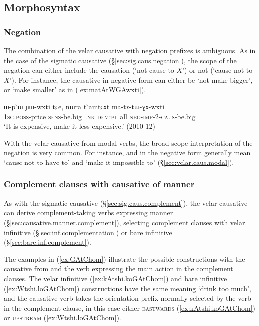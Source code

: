  
\subsection{Morphosyntax} \label{sec:velar.causative.morphosyntax}

\subsubsection{Negation} \label{sec:velar.causative.negation}
The combination of the velar causative with negation prefixes is ambiguous. As in the case of the sigmatic causative (§\ref{sec:sig.caus.negation}), the scope of the negation can either include the causation (`not cause to $X$') or not (`cause not to $X$'). For instance, the causative   in negative form can either be `not make bigger', or  `make smaller' as in (\ref{ex:matAtWGAwxti}).

\begin{exe}
\ex \label{ex:matAtWGAwxti}
\gll  ɯ-pʰɯ ɲɯ-wxti tɕe, nɯra tʰamtɕɤt ma-tɤ-tɯ-ɣɤ-wxti \\
\textsc{1sg}.\textsc{poss}-price \textsc{sens}-be.big \textsc{lnk} \textsc{dem}:\textsc{pl} all \textsc{neg}-\textsc{imp}-2-\textsc{caus}-be.big \\
\glt  `It is expensive, make it less expensive.' (2010-12)
\end{exe} 
 
With the velar causative from modal verbs, the broad scope interpretation of the negation is very common. For instance,   and   in the negative form generally mean `cause not to have to' and `make it impossible to' (§\ref{sec:velar.caus.modal}).
 
\subsubsection{Complement clauses with causative of manner} \label{sec:velar.caus.complement}
As with the sigmatic causative (§\ref{sec:sig.caus.complement}), the velar causative can derive com\-ple\-ment-taking verbs expressing manner (§\ref{sec:causative.manner.complement}), selecting complement clauses with velar infinitive (§\ref{sec:inf.complementation}) or bare infinitive (§\ref{sec:bare.inf.complement}).

The examples in (\ref{ex:GAtChom}) illustrate the possible constructions with the causative  from and the verb  expressing the main action in the complement clauses. The velar infinitive (\ref{ex:kAtshi.koGAtChom}) and bare infinitive (\ref{ex:Wtshi.loGAtChom}) constructions have the same meaning `drink too much', and the causative verb takes the orientation prefix normally selected by the verb in the complement clause, in this case either \textsc{eastwards} (\ref{ex:kAtshi.koGAtChom}) or \textsc{upstream} (\ref{ex:Wtshi.loGAtChom}). 

